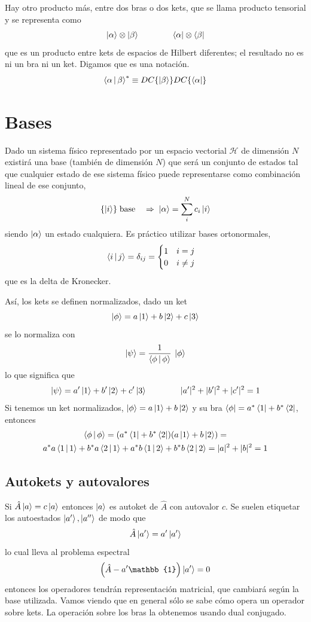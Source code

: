 \documentclass[10pt,oneside]{CBFT_book}
\begin{document}
Hay otro producto más, entre dos bras o dos kets, que se llama producto tensorial y se representa 
como 
\[
	\Ket{\alpha} \otimes \Ket{\beta} \qquad \qquad \Bra{\alpha} \otimes \Bra{\beta}
\]
que es un producto entre kets de espacios de Hilbert diferentes; el resultado no es ni un bra ni
un ket. Digamos que es una notación.
\[
	\Braket{\alpha|\beta}^* \equiv DC\{\ket{\beta}\} DC\{\Bra{\alpha}\}
\]

\section{Bases}

Dado un sistema físico representado por un espacio vectorial $\mathcal{H}$ de dimensión $N$ existirá una base (también 
de dimensión $N$) que será un conjunto de estados tal que cualquier estado de ese sistema físico puede representarse 
como combinación lineal de ese conjunto,
\[
	\{ \Ket{i}\} \; \text{base} \quad \Rightarrow \; \Ket{\alpha} = \sum_i^N c_i \Ket{i}
\]
siendo $\Ket{\alpha}$ un estado cualquiera.
Es práctico utilizar bases ortonormales,
\[
	\Braket{ i|j } = \delta_{ij} = \begin{cases}
	                                1 \quad i=j \\
	                                0 \quad i\neq j
	                               \end{cases}
\]
que es la delta de Kronecker.

Así, los kets se definen normalizados, dado un ket
\[
	\Ket{\phi} =  a \Ket{1} + b \Ket{2} + c \Ket{3}
\]
se lo normaliza con
\[
	\Ket{\psi} = \frac{1}{\Braket{\phi|\phi}}\:\Ket{\phi}
\]
lo que significa que 
\[
	\Ket{\psi} = a' \Ket{1} + b' \Ket{2} + c' \Ket{3} \qquad\qquad |a'|^2 + |b'|^2 +|c'|^2 = 1
\]
Si tenemos un ket normalizados,  $\Ket{\phi} = a \Ket{1} + b \Ket{2}$ y su bra 
$\Bra{\phi} = a^*\Bra{1} + b^* \Bra{2}$, entonces 
\begin{multline*}
 	\Braket{\phi|\phi} = (a^*\Bra{1} + b^* \Bra{2})(a \Ket{1} + b \Ket{2}) = \\
	a^*a \Braket{1|1} + b^*a\Braket{2|1} + a^*b\Braket{1|2} + b^*b\Braket{2|2} =
	|a|^2 + |b|^2 = 1
\end{multline*}
	

\subsection{Autokets y autovalores}

Si $\hat{A}\Ket{a}=c\Ket{a}$ entonces $\Ket{a}$ es autoket de $\hat{A}$ con autovalor $c$. Se suelen 
etiquetar los autoestados $\Ket{a'}, \Ket{a''}$ de modo que 
\[
	\hat{A}\Ket{a'} = a'\Ket{a'}
\]
lo cual lleva al problema espectral
\[
	\left(\hat{A} - a'\mathbb{1}\right) \Ket{a'} = 0
\]
entonces los operadores tendrán representación matricial, que cambiará según la base utilizada.
Vamos viendo que en general sólo se sabe cómo opera un operador sobre kets. La operación sobre los
bras la obtenemos usando dual conjugado.
\end{document}
